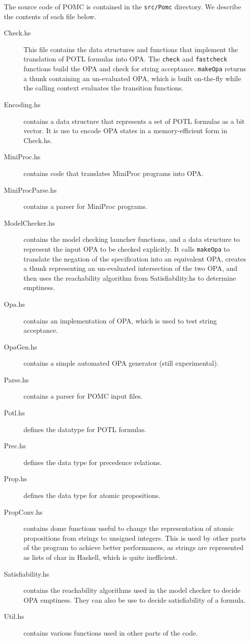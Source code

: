 \documentclass{article}
\begin{document}
The source code of POMC is contained in the \texttt{src/Pomc} directory.
We describe the contents of each file below.
\begin{description}
\item[Check.hs] This file contains the data structures and functions
  that implement the translation of POTL formulas into OPA.
  The \texttt{check} and \texttt{fastcheck} functions build the OPA
  and check for string acceptance. \texttt{makeOpa} returns
  a thunk containing an un-evaluated OPA, which is built on-the-fly
  while the calling context evaluates the transition functions.
\item[Encoding.hs] contains a data structure that represents a set of POTL
  formulas as a bit vector. It is use to encode OPA states in a
  memory-efficient form in Check.hs.
\item[MiniProc.hs] contains code that translates MiniProc programs into OPA.
\item[MiniProcParse.hs] contains a parser for MiniProc programs.
\item[ModelChecker.hs] contains the model checking launcher functions,
  and a data structure to represent the input OPA to be checked explicitly.
  It calls \texttt{makeOpa} to translate the negation of the specification
  into an equivalent OPA, creates a thunk representing an un-evaluated
  intersection of the two OPA, and then uses the reachability algorithm from
  Satisfiability.hs to determine emptiness.
\item[Opa.hs] contains an implementation of OPA, which is used to test
  string acceptance.
\item[OpaGen.hs] contains a simple automated OPA generator (still experimental).
\item[Parse.hs] contains a parser for POMC input files.
\item[Potl.hs] defines the datatype for POTL formulas.
\item[Prec.hs] defines the data type for precedence relations.
\item[Prop.hs] defines the data type for atomic propositions.
\item[PropConv.hs] contains dome functions useful to change the representation
  of atomic propositions from strings to unsigned integers.
  This is used by other parts of the program to achieve better performances,
  as strings are represented as lists of char in Haskell, which is quite
  inefficient.
\item[Satisfiability.hs] contains the reachability algorithms used in the
  model checker to decide OPA emptiness. They can also be use to decide
  satisfiability of a formula.
\item[Util.hs] contains various functions used in other parts of the code.
\end{description}




\end{document}
